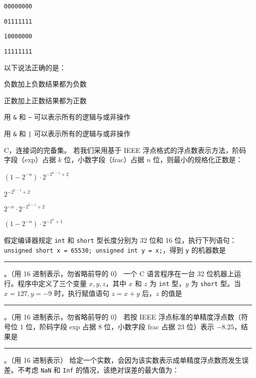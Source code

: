 \begin{problems}
\begin{figure}[H]
			\centering
		\end{figure}
		\begin{choices}
			\item \texttt{00000000}
			\item \texttt{01111111}
			\item \texttt{10000000}
			\item \texttt{11111111}
		\end{choices}
		 以下说法正确的是：
		\begin{choices}
			\item 负数加上负数结果都为负数
			\item 正数加上正数结果都为正数
			\item 用 \verb|&| 和 \verb|~| 可以表示所有的逻辑与或非操作
			\item 用 \verb|&| 和 \verb+|+ 可以表示所有的逻辑与或非操作
		\end{choices}
		\sol C，连接词的完备集。
		 若我们采用基于 IEEE 浮点格式的浮点数表示方法，阶码字段（exp）占据 $k$ 位，小数字段（frac）占据 $n$ 位，则最小的规格化正数是：
		\begin{choices}
			\item $(1-2^{-n}) \cdot 2^{-2^{k-1}+2}$
			\item $2^{-2^{k-1}+2}$
			\item $2^{-n} \cdot 2^{-2^{k-1}+2}$
			\item $(1-2^{-n}) \cdot 2^{-2^k+1}$
		\end{choices}
		 假定编译器规定 \texttt{int} 和 \texttt{short} 型长度分别为 32 位和 16 位，执行下列语句：\texttt{unsigned short x = 65530; unsigned int y = x;}，得到 \texttt{y} 的机器数是 \rule{2.5cm}{0.25mm}。（用 16 进制表示，勿省略前导的 0）
		 一个 C 语言程序在一台 32 位机器上运行。程序中定义了三个变量 $x, y, z$，其中 $x$ 和 $z$ 为 \texttt{int} 型，$y$ 为 \texttt{short} 型。当 $x=127, y=-9$ 时，执行赋值语句 $z=x+y$ 后，$z$ 的值是 \rule{2.5cm}{0.25mm}。（用 16 进制表示，勿省略前导的 0）
		 若按 IEEE 浮点标准的单精度浮点数（符号位 1 位，阶码字段 exp 占据 8 位，小数字段 frac 占据 23 位）表示 $-8.25$，结果是 \rule{2.5cm}{0.25mm}。（用 16 进制表示）
		 给定一个实数，会因为该实数表示成单精度浮点数而发生误差。不考虑 \texttt{NaN} 和 \texttt{Inf} 的情况，该绝对误差的最大值为：

\end{problems}
